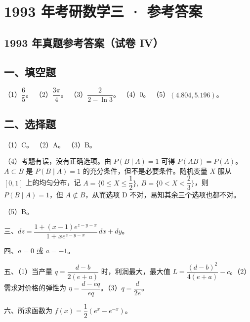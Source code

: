 \documentclass[UTF8,12pt]{ctexart}
\begin{document}
\section*{1993 年考研数学三 · 参考答案}
\subsection*{1993 年真题参考答案（试卷 IV）}

\subsection*{一、填空题}

（1）\(\displaystyle \dfrac{\displaystyle 6}{\displaystyle 5}\)。 （2）\(\displaystyle \dfrac{\displaystyle 3\pi}{\displaystyle 4}\)。 （3）\(\displaystyle \dfrac{\displaystyle 2}{\displaystyle 2-\ln3}\)。 （4）0。 （5）\(\displaystyle (4.804,\allowbreak 5.196)\)。


\subsection*{二、选择题}

（1）C。 （2）A。 （3）B。


（4）考题有误，没有正确选项。由 \(\displaystyle P(B\mid A)=1\) 可得 \(\displaystyle P(AB)=P(A)\)。\(\displaystyle A\subset B\) 是 \(\displaystyle P(B\mid A)=1\) 的充分条件，但不是必要条件。随机变量 \(\displaystyle X\) 服从 \(\displaystyle [0,\allowbreak 1]\) 上的均匀分布，记 \(\displaystyle A=\{0\leq X\leq\dfrac{\displaystyle 1}{\displaystyle 2}\},\allowbreak \ B=\{0<X<\dfrac{\displaystyle 2}{\displaystyle 3}\}\)，则 \(\displaystyle P(B\mid A)=1\)，但 \(\displaystyle A\not\subset B\)，从而选项 D 不对，易知其余三个选项也都不对。


（5）B。


三、\(\displaystyle dz=\dfrac{\displaystyle 1+(x-1)e^{z-y-x}}{\displaystyle 1+xe^{z-y-x}}\,dx+dy\)。


四、\(\displaystyle a=0\) 或 \(\displaystyle a=-1\)。


五、（1）当产量 \(\displaystyle q=\dfrac{\displaystyle d-b}{\displaystyle 2(e+a)}\) 时，利润最大，最大值 \(\displaystyle L=\dfrac{\displaystyle (d-b)^2}{\displaystyle 4(e+a)}-c\)。（2）需求对价格的弹性为 \(\displaystyle \eta=\dfrac{\displaystyle d-eq}{\displaystyle eq}\)。（3）\(\displaystyle q=\dfrac{\displaystyle d}{\displaystyle 2e}\)。


六、所求函数为 \(\displaystyle f(x)=\dfrac{\displaystyle 1}{\displaystyle 2}(e^x-e^{-x})\)。
\end{document}
